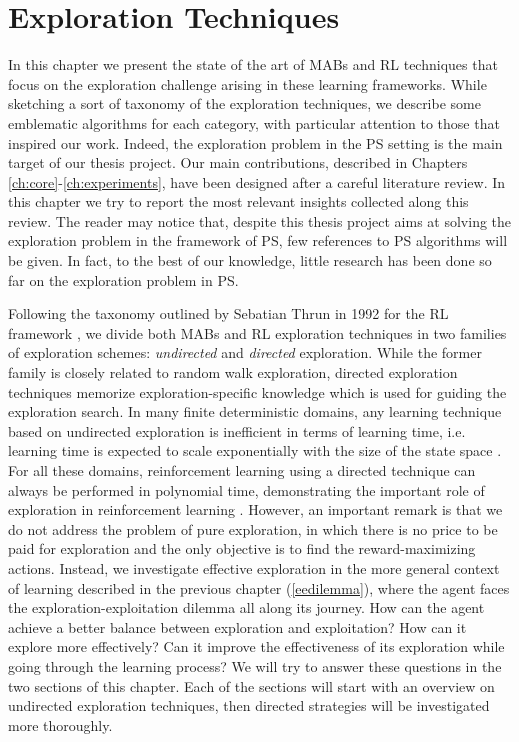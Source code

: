 
\chapter{Exploration Techniques} \label{ch:sota}

In this chapter we present the state of the art of \gls{MAB}s and \gls{RL} techniques that focus on the exploration challenge arising in these learning frameworks. While sketching a sort of taxonomy of the exploration techniques, we describe some emblematic algorithms for each category, with particular attention to those that inspired our work. Indeed, the exploration problem in the \gls{PS} setting is the main target of our thesis project. Our main contributions, described in Chapters \ref{ch:core}-\ref{ch:experiments}, have been designed after a careful literature review. In this chapter we try to report the most relevant insights collected along this review. The reader may notice that, despite this thesis project aims at solving the exploration problem in the framework of \gls{PS}, few references to \gls{PS} algorithms will be given. In fact, to the best of our knowledge, little research has been done so far on the exploration problem in \gls{PS}.

Following the taxonomy outlined by Sebatian Thrun in 1992 for the \gls{RL} framework  \cite{thrun1992efficient}, we divide both \gls{MAB}s and \gls{RL} exploration techniques in two families of exploration schemes: \emph{undirected} and \emph{directed} exploration.
While the former family is closely related to random walk exploration, directed exploration techniques memorize exploration-specific knowledge which is used for guiding the exploration search. In many finite deterministic domains, any learning technique based on undirected exploration is inefficient in terms of learning time, i.e. learning time is expected to scale exponentially with the size of the state space \cite{whitehead1991study}. For all these domains, reinforcement learning using a directed technique can always be performed in polynomial time, demonstrating the important role of exploration in reinforcement learning \cite{thrun1992efficient}. However, an important remark is that we do not address the problem of pure exploration, in which there is no price to be paid for exploration and the only objective is to find the reward-maximizing actions. Instead, we investigate effective exploration in the more general context of learning described in the previous chapter (\ref{eedilemma}), where the agent faces the exploration-exploitation dilemma all along its journey. How can the agent achieve a better balance between exploration and exploitation? How can it explore more effectively? Can it improve the effectiveness of its exploration while going through the learning process? We will try to answer these questions in the two sections of this chapter. Each of the sections will start with an overview on undirected exploration techniques, then directed strategies will be investigated more thoroughly. 

